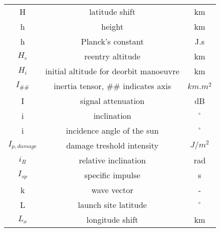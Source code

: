 \begin{center}
\begin{longtable}{c|c|c}
H                                   & latitude shift                            															& km \\

h                                   & height                                      														& km \\

h                                   & Planck's constant                           														& J.s \\

$H_e$                               & reentry altitude     																										& km \\

$H_i$                               & initial altitude for deorbit manoeuvre     															& km \\

$I_{\#\#}$                          & inertia tensor, $\#\#$ indicates axis      															& $km.m^2$ \\

I                                   & signal attenuation                         															& dB \\

i 																	& inclination 																														& $^\circ$ \\

i                                   & incidence angle of the sun                 															& $^\circ$ \\

$I_{p,damage}$											& damage treshold intensity																								& $J/m^2$ \\

$i_R$ 															& relative inclination 																										& rad \\

$I_{sp}$													 	& specific impulse 																												& s \\

k																		& wave vector																															& - \\

L                                   & launch site latitude                        														& $^\circ$ \\

$L_x$                               & longitude shift                               													& km \\


\end{longtable}
\end{center}

